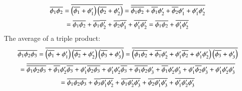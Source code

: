 \documentclass{warpdoc}
\newcommand{\alb}{\vspace{0.2cm}\\} %
\begin{document}
\begin{equation}
  \begin{array}{c}
  \overline{\phi_1  \phi_2}
   = \overline{\left( \overline{\phi_1} + \phi_1^{\prime}\right) \left(\overline{\phi_2} + \phi_2^{\prime} \right)}
   = \overline{ \overline{\phi_1}  \overline{\phi_2}
                +\overline{\phi_1}  \phi_2^{\prime}
                +\overline{\phi_2}  \phi_1^{\prime}
                +\phi_1^{\prime}  \phi_2^{\prime}} \alb
   =  \overline{\phi_1}  \overline{\phi_2}
                +\overline{\phi_1}  \overline{\phi_2^{\prime}}
                +\overline{\phi_2}  \overline{\phi_1^{\prime}}
                +\overline{\phi_1^{\prime}  \phi_2^{\prime}}
   =  \overline{\phi_1}  \overline{\phi_2}
                +\overline{\phi_1^{\prime}  \phi_2^{\prime}}
  \end{array}
\end{equation}
%
The  average of a triple product:
%
\begin{equation}
  \begin{array}{c}
  \overline{\phi_1  \phi_2  \phi_3}
   = \overline{\left(\overline{\phi_1} + \phi_1^{\prime}\right)
               \left(\overline{\phi_2} + \phi_2^{\prime} \right)
               \left(\overline{\phi_3} + \phi_3^{\prime} \right)
              }
   = \overline{\left(\overline{\phi_1} \overline{\phi_2}+\overline{\phi_1} \phi_2^{\prime}
                   + \phi_1^{\prime} \overline{\phi_2} + \phi_1^{\prime} \phi_2^{\prime} \right)
               \left(\overline{\phi_3} + \phi_3^{\prime} \right)
              } \alb
   = \overline{\overline{\phi_1} \overline{\phi_2} \overline{\phi_3}+\overline{\phi_1} \phi_2^{\prime} \overline{\phi_3}
                   + \phi_1^{\prime} \overline{\phi_2} \overline{\phi_3} + \phi_1^{\prime} \phi_2^{\prime} \overline{\phi_3}
               +\overline{\phi_1} \overline{\phi_2} \phi_3^{\prime}+\overline{\phi_1} \phi_2^{\prime} \phi_3^{\prime}
                   + \phi_1^{\prime} \overline{\phi_2} \phi_3^{\prime} + \phi_1^{\prime} \phi_2^{\prime} \phi_3^{\prime}
              } \alb
   = \overline{\phi_1} \overline{\phi_2} \overline{\phi_3}
              +\overline{\phi_3} \overline{\phi_1^{\prime} \phi_2^{\prime}}
              +\overline{\phi_1} \overline{\phi_2^{\prime} \phi_3^{\prime}}
              +\overline{\phi_2} \overline{\phi_1^{\prime} \phi_3^{\prime}}
              +\overline{\phi_1^{\prime} \phi_2^{\prime} \phi_3^{\prime}}
  \end{array}
\end{equation}
%
\end{document}
